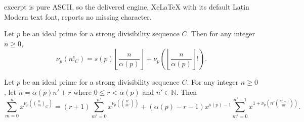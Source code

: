 \documentclass[10pt,a4paper]{amsart}
\newcommand{\N}{\mathbb{N}}
\begin{document}
excerpt is pure ASCII, so the delivered engine, XeLaTeX with its default Latin Modern text font, reports no missing character.
\begin{lemma} %
\label{lemma:idealCorial}
Let $ p $ be an ideal prime for a strong divisibility sequence $ C $. Then for any integer $ n \geq 0 $,
\[
\nu_p(n!_C) = s(p) \left\lfloor \frac{n}{\alpha(p)} \right\rfloor + \nu_p\!\left( \left\lfloor \frac{n}{\alpha(p)} \right\rfloor ! \right).
\]
\end{lemma}

\begin{lemma}
\label{lemma:idealCnomialSummationInBinomials}
Let $p$ be an ideal prime for a strong divisibility sequence $C$. For any integer $n\geq0$, let $n=\alpha(p)n'+r$ where $0 \leq r <\alpha(p)$ and $ n' \in \N $. Then
$$\sum_{m=0}^{n} x^{\nu_p\!\left( \binom{n}{m}_C \right)} = (r+1)\sum_{m'=0}^{n'} x^{\nu_p\!\left(\binom{n'}{m'}\right)} + (\alpha(p) - r - 1)x^{s(p) - 1}\sum_{m'=0}^{n'-1} x^{1+\nu_p\!\left(n'\binom{n'-1}{m'}\right)}.$$
\end{lemma}
\end{document}
